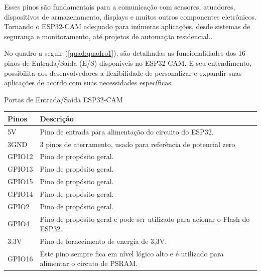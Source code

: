 Esses pinos são fundamentais para a comunicação com sensores, atuadores,
dispositivos de armazenamento, displays e muitos outros componentes
eletrônicos. Tornando o ESP32-CAM
adequado para inúmeras aplicações, desde sistemas de
segurança e monitoramento, até projetos de automação residencial..

No quadro a seguir (\autoref{quad:quadro1}), são detalhadas as funcionalidades dos 16 pinos 
de Entrada/Saída (E/S) disponíveis no ESP32-CAM. E seu entendimento, possibilita 
aos desenvolvedores a flexibilidade de personalizar e expandir suas 
aplicações de acordo com suas necessidades específicas.

\begin{tabframed}[htb]
    \caption{Portas de Entrada/Saída ESP32-CAM}
    \label{quad:quadro1}
    \begin{tabular}{|l|l|}
        \hline
        \textbf{Pinos} & \textbf{Descrição}                                                                          \\ \hline
        5V             & Pino de entrada para alimentação do circuito do ESP32.                                      \\ \hline
        3GND           & 3 pinos de aterramento, usado para referência de potencial zero                             \\ \hline
        GPIO12         & Pino de propósito geral.                                                                    \\ \hline
        GPIO13         & Pino de propósito geral.                                                                    \\ \hline
        GPIO15         & Pino de propósito geral.                                                                    \\ \hline
        GPIO14         & Pino de propósito geral.                                                                    \\ \hline
        GPIO2          & Pino de propósito geral.                                                                    \\ \hline
        GPIO4          & Pino de propósito geral e pode ser utilizado para acionar o Flash do ESP32.                 \\ \hline
        3.3V           & Pino de fornecimento de energia de 3,3V.                                                    \\ \hline
        GPIO16         & Este pino sempre fica em nível lógico alto e é utilizado para alimentar o circuto de PSRAM. \\ \hline

\end{tabular}
\end{tabframed}
